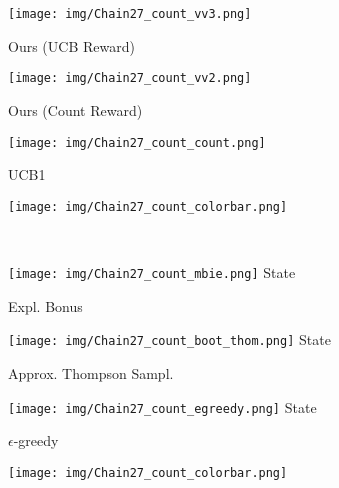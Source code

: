 \documentclass{article}
\begin{document}
\begin{figure}[t]
	\centering 
	\begin{subfigure}[b]{.3\linewidth} 
		\centering 
		\texttt{[image: img/Chain27\_count\_vv3.png]}
		\caption{\label{fig:chain_count_vv3}Ours (UCB Reward)}
	\end{subfigure}
	\hfill
	\begin{subfigure}[b]{.3\linewidth} 
		\centering 
		\texttt{[image: img/Chain27\_count\_vv2.png]}
		\caption{\label{fig:chain_count_vv2}Ours (Count Reward)}
	\end{subfigure}
	\hfill
	\begin{subfigure}[b]{.3\linewidth} 
		\centering 
		\texttt{[image: img/Chain27\_count\_count.png]}
		\caption{\label{fig:chain_count_ucb}UCB1}
	\end{subfigure} 
	\hfill
	\begin{subfigure}[b]{.04\linewidth} 
		\texttt{[image: img/Chain27\_count\_colorbar.png]}
		\centering \vspace*{6pt}
	\end{subfigure} 
	\\[0.7em]
	\begin{subfigure}[b]{.3\linewidth} 
		\centering 
		\texttt{[image: img/Chain27\_count\_mbie.png]}
		{\scriptsize \sffamily State}
		\caption{\label{fig:chain_count_mbie}Expl. Bonus}
	\end{subfigure}
	\hfill
	\begin{subfigure}[b]{.3\linewidth} 
		\centering 
		\texttt{[image: img/Chain27\_count\_boot\_thom.png]}
		{\scriptsize \sffamily State}
		\caption{\label{fig:chain_count_thomp}Approx. Thompson Sampl.}
	\end{subfigure} 
	\hfill
	\begin{subfigure}[b]{.3\linewidth} 
		\centering 
		\texttt{[image: img/Chain27\_count\_egreedy.png]}
		{\scriptsize \sffamily State}
		\caption{\label{fig:chain_count_egreedy}$\epsilon$-greedy}
	\end{subfigure} 
	\hfill
	\begin{subfigure}[b]{.04\linewidth} 
		\texttt{[image: img/Chain27\_count\_colorbar.png]}
		\phantom{\scriptsize \sffamily State}
		\centering \vspace*{6pt}
	\end{subfigure} 

\end{figure}
\end{document}
